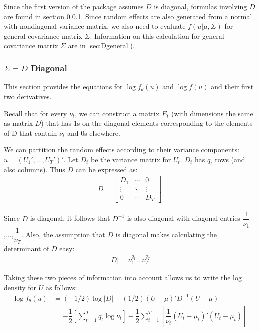 \documentclass{article}
\begin{document}
Since the first version of the package assumes $D$ is diagonal, formulas involving $D$ are found in section \ref{sec:Ddiag}.  
Since random effects are also generated from a normal with nondiagonal variance matrix, we also need to evaluate $f(u|\mu,\Sigma)$ for general covariance matrix $\Sigma$. Information on this calculation for general covariance matrix $\Sigma$ are in \ref{sec:Dgeneral}).

\subsubsection{$\Sigma=D$ Diagonal}\label{sec:Ddiag}
This section provides the equations for $\log f_\theta(u)$ and  $\log \tilde{f}(u)$ and their first two derivatives.

 Recall that for every $\nu_t$, we can construct a matrix $E_t$ (with dimensions the same as matrix $D$) that has 1s on the diagonal elements corresponding to the elements of D that contain $\nu_t$ and 0s  elsewhere.  

We can partition the random effects according to their variance components: $u=(U_1',...,U_T')'$.  Let $D_t$ be the variance matrix for $U_t$. $D_t$ has $q_t$ rows (and also columns). Thus $D$ can be expressed as:
\begin{align}
D = \begin{bmatrix} D_1 & \cdots & 0 \\ \vdots & \ddots & \vdots \\ 0 & \cdots & D_T \end{bmatrix}
\end{align}

Since $D$ is diagonal, it follows that $D^{-1}$ is also diagonal with diagonal entries $\dfrac{1}{\nu_1}$,...,$\dfrac{1}{\nu_T}$.  Also, the assumption that $D$ is diagonal makes calculating the determinant of $D$  easy:
\begin{align}
|D|= \nu_1^{q_1}...\nu_T^{q_T}
\end{align}

 Taking these two pieces of information into account allows us to write the log density for $U$ as follows:
\begin{align}
\log f_\theta(u) &= (-1/2) \log |D| - (1/2) (U-\mu)' D^{-1} (U-\mu)\\
&= -\dfrac{1}{2} \left[  \sum_{t=1}^T q_t \log \nu_t   \right]  -\dfrac{1}{2} \sum_{t=1}^T \left[ \dfrac{1}{\nu_t} (U_t-\mu_t)'(U_t-\mu_t)   \right]
\end{align}
\end{document}
